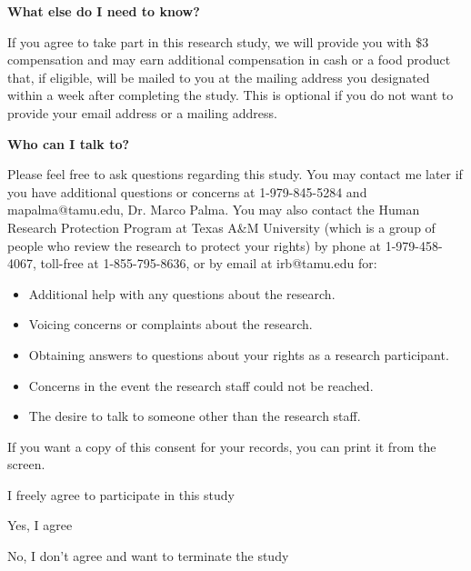 \documentclass[12pt]{article}
\begin{document}
\textbf{What else do I need to know?} \par

If you agree to take part in this research study, we will provide you with  \$3 compensation and may earn additional compensation in cash or a food product that, if eligible, will be mailed to you at the mailing address you designated within a week after completing the study. This is optional if you do not want to provide your email address or a mailing address. \par

\textbf{Who can I talk to?} \par

Please feel free to ask questions regarding this study. You may contact me later if you have additional questions or concerns at 1-979-845-5284 and mapalma@tamu.edu, Dr. Marco Palma. You may also contact the Human Research Protection Program at Texas A\&M University (which is a group of people who review the research to protect your rights) by phone at 1-979-458-4067, toll-free at 1-855-795-8636, or by email at irb@tamu.edu for:\par

\begin{itemize}
    \item Additional help with any questions about the research.
    \item Voicing concerns or complaints about the research.
    \item Obtaining answers to questions about your rights as a research participant.
    \item Concerns in the event the research staff could not be reached.
    \item The desire to talk to someone other than the research staff.
\end{itemize} \par



If you want a copy of this consent for your records, you can print it from the screen. \par

I freely agree to participate in this study \par
[Dropdown menu options:] \par
Yes, I agree \par

No, I don't agree and want to terminate the study

\vspace{0.5cm}
\end{document}
